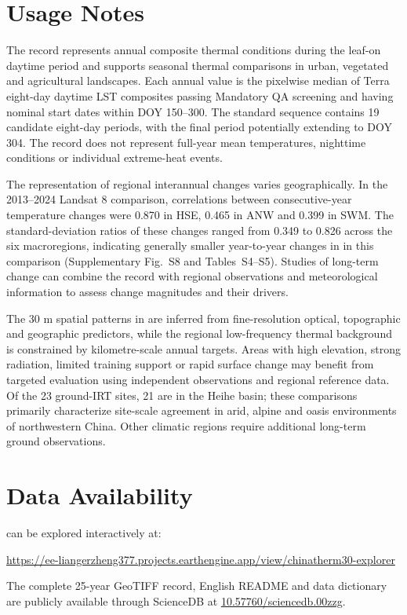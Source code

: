 \section{Usage Notes}

The record represents annual composite thermal conditions during the leaf-on daytime period and supports seasonal thermal comparisons in urban, vegetated and agricultural landscapes. Each annual value is the pixelwise median of Terra eight-day daytime LST composites passing Mandatory QA screening and having nominal start dates within DOY 150--300. The standard sequence contains 19 candidate eight-day periods, with the final period potentially extending to DOY 304. The record does not represent full-year mean temperatures, nighttime conditions or individual extreme-heat events.

The representation of regional interannual changes varies geographically. In the 2013--2024 Landsat 8 comparison, correlations between consecutive-year temperature changes were 0.870 in HSE, 0.465 in ANW and 0.399 in SWM. The standard-deviation ratios of these changes ranged from 0.349 to 0.826 across the six macroregions, indicating generally smaller year-to-year changes in \chinatherm{} in this comparison (Supplementary Fig.~S8 and Tables~S4--S5). Studies of long-term change can combine the record with regional observations and meteorological information to assess change magnitudes and their drivers.

The 30 m spatial patterns in \chinatherm{} are inferred from fine-resolution optical, topographic and geographic predictors, while the regional low-frequency thermal background is constrained by kilometre-scale annual targets. Areas with high elevation, strong radiation, limited training support or rapid surface change may benefit from targeted evaluation using independent observations and regional reference data. Of the 23 ground-IRT sites, 21 are in the Heihe basin; these comparisons primarily characterize site-scale agreement in arid, alpine and oasis environments of northwestern China. Other climatic regions require additional long-term ground observations.

\section{Data Availability}

\chinatherm{} can be explored interactively at:
\begin{center}
\url{https://ee-liangerzheng377.projects.earthengine.app/view/chinatherm30-explorer}
\end{center}
The complete 25-year GeoTIFF record, English README and data dictionary are publicly available through ScienceDB\supercite{liang2026chinatherm30} at \href{https://doi.org/10.57760/sciencedb.00zzg}{10.57760/sciencedb.00zzg}.

